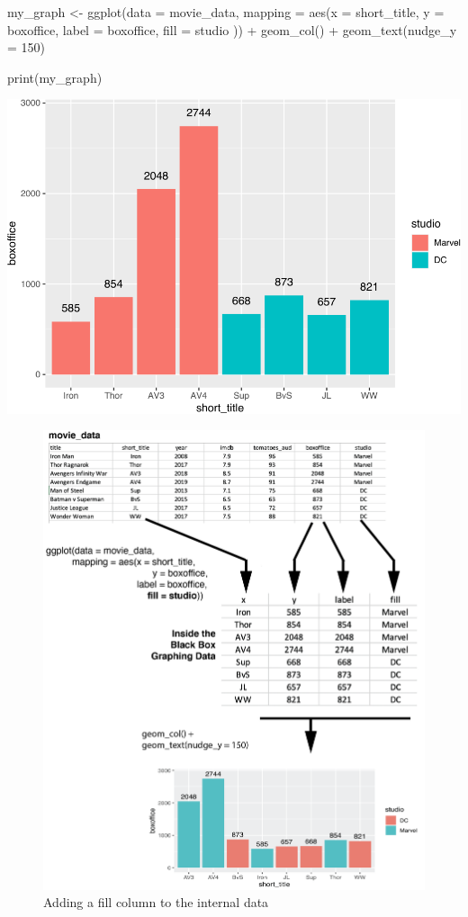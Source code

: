 \documentclass[
]{krantz}
\makeatletter
\newenvironment{Shaded}{\begin{snugshade}}{\end{snugshade}}
\newcommand{\AttributeTok}[1]{\textcolor[rgb]{0.61,0.61,0.61}{#1}}
\newcommand{\DecValTok}[1]{\textcolor[rgb]{0.06,0.06,0.06}{#1}}
\newcommand{\FunctionTok}[1]{\textcolor[rgb]{0,0,0}{#1}}
\newcommand{\NormalTok}[1]{#1}
\newcommand{\OtherTok}[1]{\textcolor[rgb]{0.37,0.37,0.37}{#1}}
\newcommand{\SpecialCharTok}[1]{\textcolor[rgb]{0,0,0}{#1}}
\newenvironment{kframe}{%
\medskip{}
\setlength{\fboxsep}{.8em}
 \def\at@end@of@kframe{}%
 \ifinner\ifhmode%
  \def\at@end@of@kframe{\end{minipage}}%
  \begin{minipage}{\columnwidth}%
 \fi\fi%
 \def\FrameCommand##1{\hskip\@totalleftmargin \hskip-\fboxsep
 \colorbox{shadecolor}{##1}\hskip-\fboxsep
     \hskip-\linewidth \hskip-\@totalleftmargin \hskip\columnwidth}%
 \MakeFramed {\advance\hsize-\width
   \@totalleftmargin\z@ \linewidth\hsize
   \@setminipage}}%
 {\par\unskip\endMakeFramed%
 \at@end@of@kframe}
\renewenvironment{Shaded}{\begin{kframe}}{\end{kframe}}
\makeatother
\begin{document}
\begin{Shaded}
\begin{Highlighting}[]
\NormalTok{my\_graph }\OtherTok{\textless{}{-}} \FunctionTok{ggplot}\NormalTok{(}\AttributeTok{data =}\NormalTok{ movie\_data,}
           \AttributeTok{mapping =} \FunctionTok{aes}\NormalTok{(}\AttributeTok{x =}\NormalTok{ short\_title,}
                         \AttributeTok{y =}\NormalTok{ boxoffice,}
                         \AttributeTok{label =}\NormalTok{ boxoffice,}
                         \AttributeTok{fill =}\NormalTok{ studio )) }\SpecialCharTok{+}
  \FunctionTok{geom\_col}\NormalTok{() }\SpecialCharTok{+}
  \FunctionTok{geom\_text}\NormalTok{(}\AttributeTok{nudge\_y =} \DecValTok{150}\NormalTok{) }

\FunctionTok{print}\NormalTok{(my\_graph)}
\end{Highlighting}
\end{Shaded}

\includegraphics[width=0.65\linewidth]{bookdown_files/figure-latex/unnamed-chunk-202-1}

\begin{figure}
\includegraphics[width=0.7\linewidth]{ch_graphing/images/mapping_fill} \caption{Adding a fill column to the internal data}\label{fig:addfill}
\end{figure}
\end{document}
